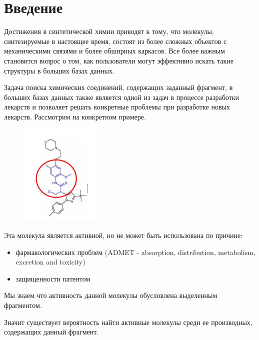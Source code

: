 \documentclass[12pt]{article}
\title{\flushleft{Задача подструктурного поиска химического соединения}}
\date{}
\begin{document}
\maketitle
\thispagestyle{fancy}

\section{Введение}

Достижения в синтетической химии приводят к тому, что молекулы, синтезируемые в настоящее время, состоят из более сложных объектов с механическими связями и более обширных каркасов. Все более важным становится вопрос о том, как пользователи могут эффективно искать такие структуры в больших базах данных.

Задача поиска химических соединений, содержащих заданный фрагмент, в больших базах данных также является одной из задач в процессе разработки лекарств и позволяет решать конкретные проблемы при разработке новых лекарств. Рассмотрим на конкретном примере.

\begin{figure}
    \includegraphics[width=0.35\textwidth]{img/abstract}
\end{figure}


Эта молекула является активной, но не может быть использована по причине:
\begin{itemize}
  \item фармакологических проблем (ADMET - absorption, distribution, metabolism, excretion and toxicity)
  \item защищенности патентом
\end{itemize}

Мы знаем что активность данной молекулы обусловлена выделенным фрагментом.

Значит существует вероятность найти активные молекулы среди ее производных, содержащих данный фрагмент.
\end{document}
